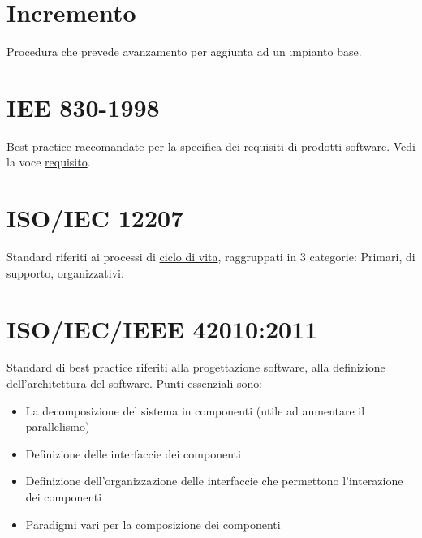 	\section{Incremento}
	\label{sec:incremento}
	Procedura che prevede avanzamento per aggiunta ad un impianto base.

	\section{IEE 830-1998}
	\label{sec:iee830}
	Best practice raccomandate per la specifica dei requisiti di prodotti software. Vedi la voce \hyperref[sec:requisito]{requisito}.
	\linebreak

	\section{ISO/IEC 12207}
	\label{sec:iso12207}
	Standard riferiti ai processi di \hyperref[sec:ciclodivita]{ciclo di vita}, raggruppati in 3 categorie: Primari, di supporto, organizzativi.
	\linebreak

	\section{ISO/IEC/IEEE 42010:2011}
	\label{sec:iso12207}
	Standard di best practice riferiti alla progettazione software, alla definizione dell'architettura del software. Punti essenziali sono:
	\begin{itemize}  
	\item La decomposizione del sistema in componenti (utile ad aumentare il parallelismo)
	\item Definizione delle interfaccie dei componenti 
	\item Definizione dell'organizzazione delle interfaccie che permettono l'interazione dei componenti
	\item Paradigmi vari per la composizione dei componenti 
	\end{itemize}		

